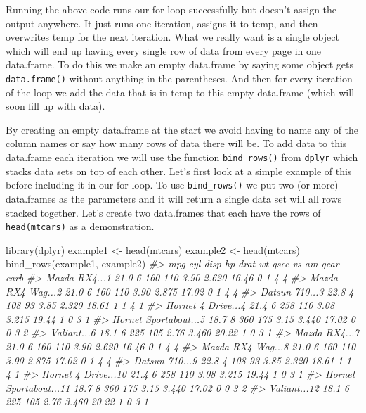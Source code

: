 \documentclass[
]{krantz}
\makeatletter
\newenvironment{Shaded}{\begin{snugshade}}{\end{snugshade}}
\newcommand{\CommentTok}[1]{\textcolor[rgb]{0.37,0.37,0.37}{\textit{#1}}}
\newcommand{\FunctionTok}[1]{\textcolor[rgb]{0,0,0}{#1}}
\newcommand{\NormalTok}[1]{#1}
\newcommand{\OtherTok}[1]{\textcolor[rgb]{0.37,0.37,0.37}{#1}}
\newenvironment{kframe}{%
\medskip{}
\setlength{\fboxsep}{.8em}
 \def\at@end@of@kframe{}%
 \ifinner\ifhmode%
  \def\at@end@of@kframe{\end{minipage}}%
  \begin{minipage}{\columnwidth}%
 \fi\fi%
 \def\FrameCommand##1{\hskip\@totalleftmargin \hskip-\fboxsep
 \colorbox{shadecolor}{##1}\hskip-\fboxsep
     \hskip-\linewidth \hskip-\@totalleftmargin \hskip\columnwidth}%
 \MakeFramed {\advance\hsize-\width
   \@totalleftmargin\z@ \linewidth\hsize
   \@setminipage}}%
 {\par\unskip\endMakeFramed%
 \at@end@of@kframe}
\renewenvironment{Shaded}{\begin{kframe}}{\end{kframe}}
\makeatother
\begin{document}
Running the above code runs our for loop successfully but doesn't assign the output anywhere. It just runs one iteration, assigns it to temp, and then overwrites temp for the next iteration. What we really want is a single object which will end up having every single row of data from every page in one data.frame. To do this we make an empty data.frame by saying some object gets \texttt{data.frame()} without anything in the parentheses. And then for every iteration of the loop we add the data that is in temp to this empty data.frame (which will soon fill up with data).

By creating an empty data.frame at the start we avoid having to name any of the column names or say how many rows of data there will be. To add data to this data.frame each iteration we will use the function \texttt{bind\_rows()} from \texttt{dplyr} which stacks data sets on top of each other. Let's first look at a simple example of this before including it in our for loop. To use \texttt{bind\_rows()} we put two (or more) data.frames as the parameters and it will return a single data set will all rows stacked together. Let's create two data.frames that each have the rows of \texttt{head(mtcars)} as a demonstration.

\begin{Shaded}
\begin{Highlighting}[]
\FunctionTok{library}\NormalTok{(dplyr)}
\NormalTok{example1 }\OtherTok{\textless{}{-}} \FunctionTok{head}\NormalTok{(mtcars)}
\NormalTok{example2 }\OtherTok{\textless{}{-}} \FunctionTok{head}\NormalTok{(mtcars)}
\FunctionTok{bind\_rows}\NormalTok{(example1, example2)}
\CommentTok{\#\textgreater{}                         mpg cyl disp  hp drat    wt  qsec vs am gear carb}
\CommentTok{\#\textgreater{} Mazda RX4...1          21.0   6  160 110 3.90 2.620 16.46  0  1    4    4}
\CommentTok{\#\textgreater{} Mazda RX4 Wag...2      21.0   6  160 110 3.90 2.875 17.02  0  1    4    4}
\CommentTok{\#\textgreater{} Datsun 710...3         22.8   4  108  93 3.85 2.320 18.61  1  1    4    1}
\CommentTok{\#\textgreater{} Hornet 4 Drive...4     21.4   6  258 110 3.08 3.215 19.44  1  0    3    1}
\CommentTok{\#\textgreater{} Hornet Sportabout...5  18.7   8  360 175 3.15 3.440 17.02  0  0    3    2}
\CommentTok{\#\textgreater{} Valiant...6            18.1   6  225 105 2.76 3.460 20.22  1  0    3    1}
\CommentTok{\#\textgreater{} Mazda RX4...7          21.0   6  160 110 3.90 2.620 16.46  0  1    4    4}
\CommentTok{\#\textgreater{} Mazda RX4 Wag...8      21.0   6  160 110 3.90 2.875 17.02  0  1    4    4}
\CommentTok{\#\textgreater{} Datsun 710...9         22.8   4  108  93 3.85 2.320 18.61  1  1    4    1}
\CommentTok{\#\textgreater{} Hornet 4 Drive...10    21.4   6  258 110 3.08 3.215 19.44  1  0    3    1}
\CommentTok{\#\textgreater{} Hornet Sportabout...11 18.7   8  360 175 3.15 3.440 17.02  0  0    3    2}
\CommentTok{\#\textgreater{} Valiant...12           18.1   6  225 105 2.76 3.460 20.22  1  0    3    1}
\end{Highlighting}
\end{Shaded}
\end{document}
